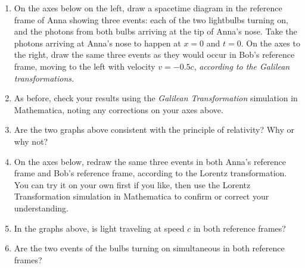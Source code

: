 \begin{enumerate}[labparts]
\item On the axes below on the left, draw a spacetime diagram in the reference frame of Anna showing three events: each of the two lightbulbs turning on, and the photons from both bulbs arriving at the tip of Anna’s nose.  Take the photons arriving at Anna’s nose to happen at $x=0$ and $t=0$.  On the axes to the right, draw the same three events as they would occur in Bob's reference frame, moving to the left with velocity $v=-0.5c$, \textit{according to the Galilean transformations.}

\begin{center}
\raisebox{0.7in}{Galilean Transformation:}\hspace{0.2in}
\begin{lab_axis}[lab_noticks_4quads,
	width=1.5in, height=1.5in,
	xlabel={$x$},
	ylabel={$t$},
	title={Anna's Frame}
	]
\end{lab_axis}
\hspace{0.3in}
\begin{lab_axis}[lab_noticks_4quads,
	width=1.5in, height=1.5in,
	xlabel={$x$},
	ylabel={$t$},
	title={Bob's Frame}
	]
\end{lab_axis}
\end{center}

\item As before, check your results using the \textit{Galilean Transformation} simulation in Mathematica, noting any corrections on your axes above.

\item Are the two graphs above consistent with the principle of relativity?  Why or why not?
\answerspace{0.6in}

\item On the axes below, redraw the same three events in both Anna's reference frame and Bob's reference frame, according to the Lorentz transformation.  You can try it on your own first if you like, then use the Lorentz Transformation simulation in Mathematica to confirm or correct your understanding.

\begin{center}
\raisebox{0.7in}{Lorentz Transformation:}\hspace{0.2in}
\begin{lab_axis}[lab_noticks_4quads,
	width=1.5in, height=1.5in,
	xlabel={$x$},
	ylabel={$t$},
	title={Anna's Frame}
	]
\end{lab_axis}
\hspace{0.3in}
\begin{lab_axis}[lab_noticks_4quads,
	width=1.5in, height=1.5in,
	xlabel={$x$},
	ylabel={$t$},
	title={Bob's Frame}
	]
\end{lab_axis}
\end{center}

\item In the graphs above, is light traveling at speed $c$ in both reference frames?
\answerspace{0.6in}

\item Are the two events of the bulbs turning on simultaneous in both reference frames?


\end{enumerate}
